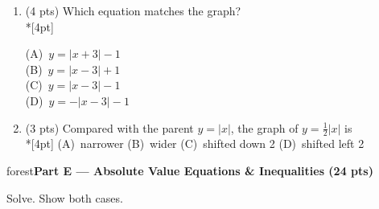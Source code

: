 \documentclass[12pt]{article}
\newcommand{\lgrid}[4]{%
  \draw[step=1, linegray!40, very thin] (#1,#3) grid (#2,#4);
  \draw[->, semithick, charcoal] (#1,0)--(#2,0) node[below right, font=\scriptsize]{$x$};
  \draw[->, semithick, charcoal] (0,#3)--(0,#4) node[left, font=\scriptsize]{$y$};}
\newcommand{\parthead}[1]{%
  \boxguard[10]\vspace{6pt}\noindent
  \begin{headlinebox}{forest}\color{white}\bfseries #1\end{headlinebox}%
  \vspace{4pt}}
\newcommand{\opt}[2]{(#1)~#2}
\newcommand{\optok}[2]{(#1)~#2}
\begin{document}
\begin{enumerate}[leftmargin=1.9em, itemsep=10pt, label=\arabic*., start=15]
  \item {}(4 pts) Which equation matches the graph?
    \\*[4pt]
    \begin{minipage}[c]{0.36\linewidth}\centering
    \end{minipage}%
    \begin{minipage}[c]{0.6\linewidth}
    \opt{A}{$y=|x+3|-1$} \\[6pt]
    \opt{B}{$y=|x-3|+1$} \\[6pt]
    \optok{C}{$y=|x-3|-1$} \\[6pt]
    \opt{D}{$y=-|x-3|-1$}
    \end{minipage}

  \item {}(3 pts) Compared with the parent $y=|x|$, the graph of $y=\tfrac{1}{2}|x|$ is
    \\*[4pt]
    \opt{A}{narrower} \hfill \optok{B}{wider} \hfill \opt{C}{shifted down 2} \hfill
    \opt{D}{shifted left 2}
\end{enumerate}

\parthead{Part E --- Absolute Value Equations \& Inequalities (24 pts)}
Solve. Show both cases.
\end{document}
